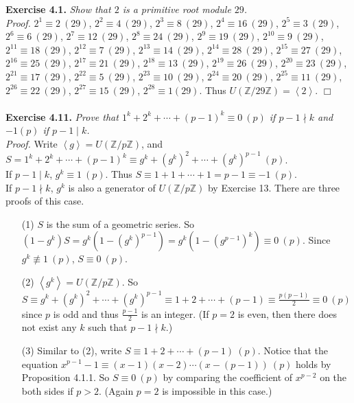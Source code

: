 \documentclass{article}
\begin{document}
\textbf{Exercise 4.1.} \emph{Show that $2$ is a primitive root module $29$.}\\

\emph{Proof.}
$2^1 \equiv 2 \: (29)$,
$2^2 \equiv 4 \: (29)$,
$2^3 \equiv 8 \: (29)$,
$2^4 \equiv 16 \: (29)$,
$2^5 \equiv 3 \: (29)$,
$2^6 \equiv 6 \: (29)$,
$2^7 \equiv 12 \: (29)$,
$2^8 \equiv 24 \: (29)$,
$2^9 \equiv 19 \: (29)$,
$2^{10} \equiv 9 \: (29)$,
$2^{11} \equiv 18 \: (29)$,
$2^{12} \equiv 7 \: (29)$,
$2^{13} \equiv 14 \: (29)$,
$2^{14} \equiv 28 \: (29)$,
$2^{15} \equiv 27 \: (29)$,
$2^{16} \equiv 25 \: (29)$,
$2^{17} \equiv 21 \: (29)$,
$2^{18} \equiv 13 \: (29)$,
$2^{19} \equiv 26 \: (29)$,
$2^{20} \equiv 23 \: (29)$,
$2^{21} \equiv 17 \: (29)$,
$2^{22} \equiv 5 \: (29)$,
$2^{23} \equiv 10 \: (29)$,
$2^{24} \equiv 20 \: (29)$,
$2^{25} \equiv 11 \: (29)$,
$2^{26} \equiv 22 \: (29)$,
$2^{27} \equiv 15 \: (29)$,
$2^{28} \equiv 1 (29)$. Thus
$U(\mathbb{Z}/29\mathbb{Z}) = \left \langle 2 \right \rangle$.
$\Box$ \\\\



\textbf{Exercise 4.11.} \emph{Prove that $1^k + 2^k + \cdots + (p-1)^k \equiv 0 \: (p)$
if $p - 1 \nmid k$ and $-1 (p)$ if $p - 1 \mid k$.} \\

\emph{Proof.}
Write $\left \langle g \right \rangle = U(\mathbb{Z}/p\mathbb{Z})$, and
$S = 1^k + 2^k + \cdots + (p-1)^k \equiv g^k + (g^k)^2 + \cdots + (g^k)^{p - 1} \: (p)$. \\

If $p - 1 \mid k$, $g^k \equiv 1 \: (p)$. Thus
$S \equiv 1 + 1 + \cdots + 1 = p - 1 \equiv -1 \: (p)$. \\

If $p - 1 \nmid k$, $g^k$ is also a generator of $U(\mathbb{Z}/p\mathbb{Z})$ by Exercise 13.
There are three proofs of this case.
\begin{enumerate}
\item[(1)]
$S$ is the sum of a geometric series.
So $(1 - g^k) S = g^k (1 - (g^k)^{p - 1}) = g^k (1 - (g^{p - 1})^k) \equiv 0 \: (p)$.
Since $g^k \not\equiv 1 \: (p)$, $S \equiv 0 \: (p)$.
\item[(2)]
$\left \langle g^k \right \rangle = U(\mathbb{Z}/p\mathbb{Z})$. So
$S \equiv g^k + (g^k)^2 + \cdots + (g^k)^{p - 1} \equiv 1 + 2 + \cdots + (p - 1)
\equiv \frac{p(p - 1)}{2} \equiv 0 \: (p)$ since $p$ is odd and
thus $\frac{p - 1}{2}$ is an integer.
(If $p = 2$ is even, then there does not exist any $k$ such that $p - 1 \nmid k$.)
\item[(3)]
Similar to (2), write $S \equiv 1 + 2 + \cdots + (p - 1) \: (p)$. Notice that the equation
$x^{p - 1} - 1 \equiv (x - 1)(x - 2) \cdots (x - (p - 1)) \: (p)$ holds by Proposition 4.1.1.
So $S \equiv 0 \: (p)$ by comparing the coefficient of $x^{p - 2}$ on the both sides if $p > 2$.
(Again $p = 2$ is impossible in this case.)
\end{enumerate}
\end{document}
